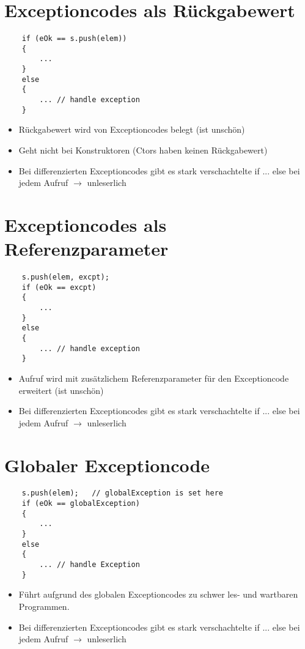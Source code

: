 \section{Exceptioncodes als Rückgabewert}
\label{sec:Exceptioncodes als Rueckgabewert}
\noindent
\begin{minipage}{\linewidth}
	\begin{lstlisting}
	if (eOk == s.push(elem))
	{
		...
	}
	else
	{
		... // handle exception
	}
	\end{lstlisting}
\end{minipage}
\begin{itemize}
	\item Rückgabewert wird von Exceptioncodes belegt (ist unschön)
	\item Geht nicht bei Konstruktoren (Ctors haben keinen Rückgabewert)
	\item Bei differenzierten Exceptioncodes gibt es stark verschachtelte if ... else bei jedem Aufruf $\rightarrow$ unleserlich
\end{itemize}

\section{Exceptioncodes als Referenzparameter}
\label{sec:Exceptioncodes als Referenzparameter}
\noindent
\begin{minipage}{\linewidth}
	\begin{lstlisting}
	s.push(elem, excpt);
	if (eOk == excpt)
	{
		...
	}
	else
	{
		... // handle exception
	}
	\end{lstlisting}
\end{minipage}
\begin{itemize}
	\item Aufruf wird mit zusätzlichem Referenzparameter für den Exceptioncode erweitert (ist unschön)
	\item Bei differenzierten Exceptioncodes gibt es stark verschachtelte if ... else bei jedem Aufruf $\rightarrow$ unleserlich	
\end{itemize}

\section{Globaler Exceptioncode}
\label{sec:Globaler Exceptioncode}
\noindent
\begin{minipage}{\linewidth}
	\begin{lstlisting}
	s.push(elem);	// globalException is set here
	if (eOk == globalException)
	{
		...
	}
	else
	{
		... // handle Exception
	}
	\end{lstlisting}	
\end{minipage}
\begin{itemize}
	\item Führt aufgrund des globalen Exceptioncodes zu schwer les- und wartbaren Programmen.
	\item Bei differenzierten Exceptioncodes gibt es stark verschachtelte if ... else bei jedem Aufruf $\rightarrow$ unleserlich
\end{itemize}

